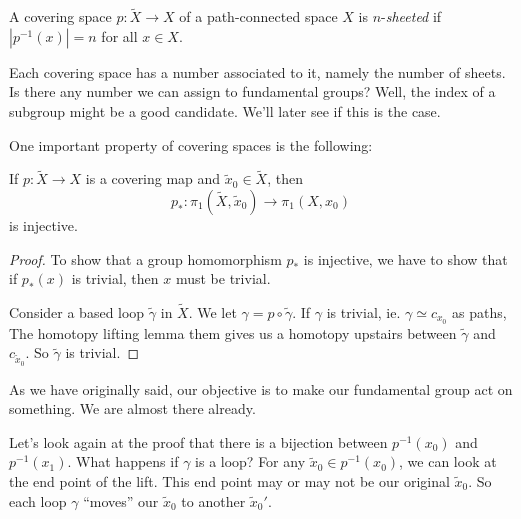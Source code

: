 \documentclass[a4paper]{article}
\begin{document}
\begin{defi}[$n$-sheeted]
  A covering space $p: \tilde{X} \to X$ of a path-connected space $X$ is $n$-\emph{sheeted} if $|p^{-1}(x)| = n$ for all $x \in X$.
\end{defi}
Each covering space has a number associated to it, namely the number of sheets. Is there any number we can assign to fundamental groups? Well, the index of a subgroup might be a good candidate. We'll later see if this is the case.

One important property of covering spaces is the following:
\begin{lemma}
  If $p: \tilde{X} \to X$ is a covering map and $\tilde{x}_0 \in \tilde{X}$, then
  \[
    p_*: \pi_1(\tilde{X}, \tilde{x}_0) \to \pi_1(X, x_0)
  \]
  is injective.
\end{lemma}

\begin{proof}
  To show that a group homomorphism $p_*$ is injective, we have to show that if $p_*(x)$ is trivial, then $x$ must be trivial.

  Consider a based loop $\tilde{\gamma}$ in $\tilde{X}$. We let $\gamma = p\circ \tilde{\gamma}$. If $\gamma$ is trivial, ie. $\gamma \simeq c_{x_0}$ as paths, The homotopy lifting lemma them gives us a homotopy upstairs between $\tilde{\gamma}$ and $c_{\tilde{x}_0}$. So $\tilde{\gamma}$ is trivial.
\end{proof}

As we have originally said, our objective is to make our fundamental group act on something. We are almost there already.

Let's look again at the proof that there is a bijection between $p^{-1}(x_0)$ and $p^{-1}(x_1)$. What happens if $\gamma$ is a loop? For any $\tilde{x}_0 \in p^{-1}(x_0)$, we can look at the end point of the lift. This end point may or may not be our original $\tilde{x}_0$. So each loop $\gamma$ ``moves'' our $\tilde{x}_0$ to another $\tilde{x}_0'$.
\end{document}
